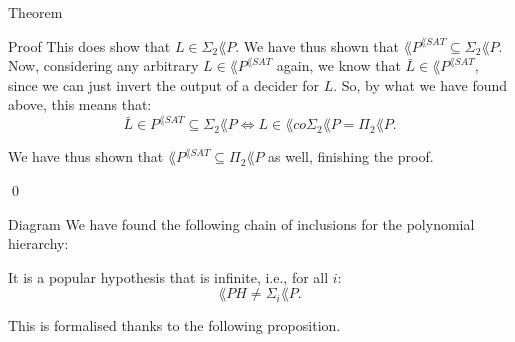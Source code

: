 \documentclass[a4paper]{article}
\begin{document}
\begin{parag}{Theorem}
\begin{subparag}{Proof}
        This does show that $L \in \Sigma_2 \lang{P}$. We have thus shown that $\lang{P}^{\lang{SAT}} \subseteq \Sigma_2 \lang{P}$. Now, considering any arbitrary $L \in \lang{P}^{\lang{SAT}}$ again, we know that $\bar{L} \in \lang{P}^{\lang{SAT}}$, since we can just invert the output of a decider for $L$. So, by what we have found above, this means that: 
        \[\bar{L} \in P^{\lang{SAT}} \subseteq \Sigma_2 \lang{P} \iff L \in \lang{co} \Sigma_2 \lang{P} = \Pi_2 \lang{P}.\]
        
        We have thus shown that $\lang{P}^{\lang{SAT}} \subseteq \Pi_2 \lang{P}$ as well, finishing the proof.

        \qed
    \end{subparag}
\end{parag}

\begin{parag}{Diagram}
    We have found the following chain of inclusions for the polynomial hierarchy:

    It is a popular hypothesis that  is infinite, i.e., for all $i$:
    \[\lang{PH} \neq \Sigma_i \lang{P}.\]

    This is formalised thanks to the following proposition.
\end{parag}
\end{document}
